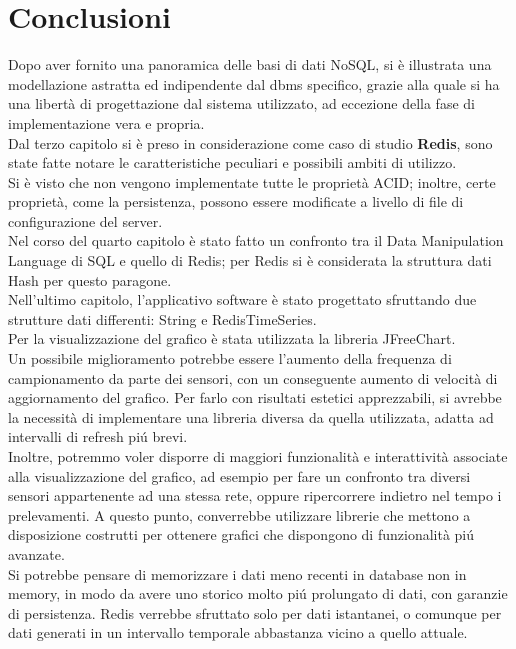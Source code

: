 \chapter{Conclusioni}
Dopo aver fornito una panoramica delle basi di dati NoSQL,
si è illustrata una modellazione astratta ed indipendente dal dbms specifico, grazie alla quale si ha una libertà
di progettazione dal sistema utilizzato, ad eccezione della fase di implementazione vera e propria.\\
Dal terzo capitolo si è preso in considerazione come caso di studio \textbf{Redis}, sono state fatte notare le caratteristiche peculiari e possibili ambiti di utilizzo.\\
Si è visto che non vengono implementate tutte le proprietà ACID; inoltre, certe proprietà, come la persistenza,
possono essere modificate a livello di file di configurazione del server.\\
Nel corso del quarto capitolo è stato fatto un confronto tra il Data Manipulation Language di SQL
e quello di Redis;
per Redis si è considerata la struttura dati Hash per questo paragone.\\
Nell'ultimo capitolo, l'applicativo software è stato progettato sfruttando due strutture dati differenti: String e RedisTimeSeries.\\
Per la visualizzazione del grafico è stata utilizzata la libreria JFreeChart.\\
Un possibile miglioramento potrebbe essere l'aumento della frequenza di campionamento da parte dei sensori, con un conseguente aumento di velocità di aggiornamento del grafico.
Per farlo con risultati estetici apprezzabili, si avrebbe la necessità
di implementare una libreria diversa da quella utilizzata, adatta ad intervalli di refresh piú brevi.\\
Inoltre, potremmo voler disporre di maggiori funzionalità e interattività associate alla visualizzazione del grafico, ad esempio per fare un confronto tra diversi sensori appartenente ad una stessa rete, oppure
ripercorrere indietro nel tempo i prelevamenti.
A questo punto, converrebbe utilizzare librerie che mettono a disposizione costrutti per ottenere grafici che dispongono di funzionalità piú avanzate.\\
Si potrebbe pensare di memorizzare i dati meno recenti in database non in memory, in modo da avere uno storico molto piú prolungato di dati, con garanzie di persistenza.
Redis verrebbe sfruttato solo per dati istantanei, o comunque per dati generati in un intervallo temporale abbastanza vicino a quello attuale.\\

